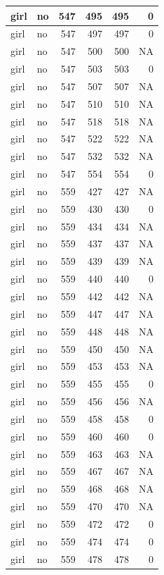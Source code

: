\documentclass[man]{apa6}
\begin{document}
\begin{tabular}{l|l|r|r|r|r}
\hline
girl & no & 547 & 495 & 495 & 0\\
\hline
girl & no & 547 & 497 & 497 & 0\\
\hline
girl & no & 547 & 500 & 500 & NA\\
\hline
girl & no & 547 & 503 & 503 & 0\\
\hline
girl & no & 547 & 507 & 507 & NA\\
\hline
girl & no & 547 & 510 & 510 & NA\\
\hline
girl & no & 547 & 518 & 518 & NA\\
\hline
girl & no & 547 & 522 & 522 & NA\\
\hline
girl & no & 547 & 532 & 532 & NA\\
\hline
girl & no & 547 & 554 & 554 & 0\\
\hline
girl & no & 559 & 427 & 427 & NA\\
\hline
girl & no & 559 & 430 & 430 & 0\\
\hline
girl & no & 559 & 434 & 434 & NA\\
\hline
girl & no & 559 & 437 & 437 & NA\\
\hline
girl & no & 559 & 439 & 439 & NA\\
\hline
girl & no & 559 & 440 & 440 & 0\\
\hline
girl & no & 559 & 442 & 442 & NA\\
\hline
girl & no & 559 & 447 & 447 & NA\\
\hline
girl & no & 559 & 448 & 448 & NA\\
\hline
girl & no & 559 & 450 & 450 & NA\\
\hline
girl & no & 559 & 453 & 453 & NA\\
\hline
girl & no & 559 & 455 & 455 & 0\\
\hline
girl & no & 559 & 456 & 456 & NA\\
\hline
girl & no & 559 & 458 & 458 & 0\\
\hline
girl & no & 559 & 460 & 460 & 0\\
\hline
girl & no & 559 & 463 & 463 & NA\\
\hline
girl & no & 559 & 467 & 467 & NA\\
\hline
girl & no & 559 & 468 & 468 & NA\\
\hline
girl & no & 559 & 470 & 470 & NA\\
\hline
girl & no & 559 & 472 & 472 & 0\\
\hline
girl & no & 559 & 474 & 474 & 0\\
\hline
girl & no & 559 & 478 & 478 & 0\\

\end{tabular}
\end{document}
